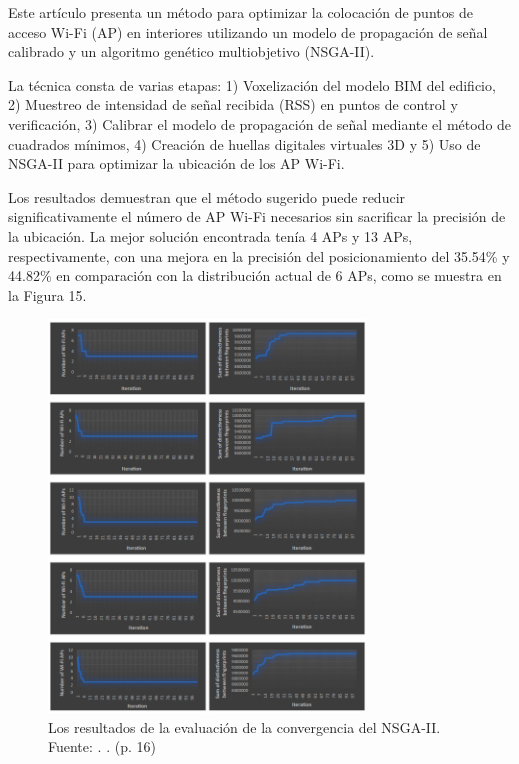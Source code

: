Este artículo presenta un método para optimizar la colocación de puntos de acceso Wi-Fi (AP) en interiores utilizando un modelo de propagación de señal calibrado y un algoritmo genético multiobjetivo (NSGA-II).

La técnica consta de varias etapas: 1) Voxelización del modelo BIM del edificio, 2) Muestreo de intensidad de señal recibida (RSS) en puntos de control y verificación, 3) Calibrar el modelo de propagación de señal mediante el método de cuadrados mínimos, 4) Creación de huellas digitales virtuales 3D y 5) Uso de NSGA-II para optimizar la ubicación de los AP Wi-Fi. 

Los resultados demuestran que el método sugerido puede reducir significativamente el número de AP Wi-Fi necesarios sin sacrificar la precisión de la ubicación. La mejor solución encontrada tenía 4 APs y 13 APs, respectivamente, con una mejora en la precisión del posicionamiento del 35.54\% y 44.82\% en comparación con la distribución actual de 6 APs, como se muestra en la Figura 15.

\begin{figure}[!ht]
	\begin{center}
		\includegraphics[width=0.75\textwidth]{2/figures/hosseini2023.png}
		\caption[Los resultados de la evaluación de la convergencia del NSGA-II]{Los resultados de la evaluación de la convergencia del NSGA-II.\\
		Fuente: \cite{pr_hosseini2023NSGAIIap}. . (p. 16)}
		\label{2:fig123}
	\end{center}
\end{figure}

